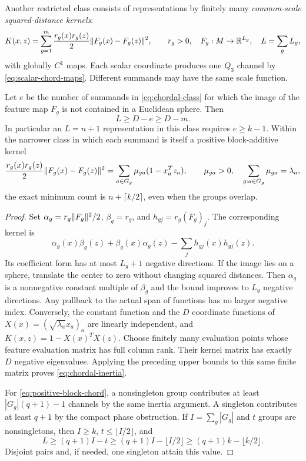 Another restricted class consists of representations by finitely many
\emph{common-scale squared-distance kernels}:
\begin{equation}\label{eq:chordal-class}
 K(x,z)=\sum_{g=1}^m\frac{r_g(x)r_g(z)}2
                  \lVert F_g(x)-F_g(z)\rVert^2,
 \qquad r_g>0,\quad F_g:M\to\mathbb R^{L_g},\quad L=\sum_g L_g,
\end{equation}
with globally $C^1$ maps. Each scalar coordinate produces one $Q_3$
channel by \eqref{eq:scalar-chord-maps}. Different summands may have the
same scale function.

\begin{proposition}\label{prop:chordal-inertia}
Let $e$ be the number of summands in \eqref{eq:chordal-class} for which
the image of the feature map $F_g$ is not contained in a Euclidean
sphere. Then
\begin{equation}\label{eq:chordal-inertia}
 L\geq D-e\geq D-m.
\end{equation}
In particular an $L=n+1$ representation in this class requires $e\geq k-1$.
Within the narrower class in which each summand is itself a positive
block-additive kernel
\begin{equation}\label{eq:positive-block-chord}
 \frac{r_g(x)r_g(z)}2\lVert F_g(x)-F_g(z)\rVert^2
   =\sum_{a\in G_g}\mu_{ga}(1-x_a^Tz_a),\qquad
 \mu_{ga}>0,\quad \sum_{g:a\in G_g}\mu_{ga}=\lambda_a,
\end{equation}
the exact minimum count is $n+\lceil k/2\rceil$, even when the groups
overlap.
\end{proposition}
\begin{proof}
Set $\alpha_g=r_g\lVert F_g\rVert^2/2$, $\beta_g=r_g$, and
$h_{gj}=r_g(F_g)_j$. The corresponding kernel is
\[
 \alpha_g(x)\beta_g(z)+\beta_g(x)\alpha_g(z)
                  -\sum_jh_{gj}(x)h_{gj}(z).
\]
Its coefficient form has at most $L_g+1$ negative directions. If the
image lies on a sphere, translate the center to zero without changing
squared distances. Then $\alpha_g$ is a nonnegative constant multiple
of $\beta_g$ and the bound improves to $L_g$ negative directions.
Any pullback to the actual span of functions has no larger negative
index. Conversely, the constant function and the $D$ coordinate
functions of $X(x)=(\sqrt{\lambda_a}x_a)_a$ are linearly independent,
and $K(x,z)=1-X(x)^TX(z)$. Choose finitely many evaluation points whose
feature evaluation matrix has full column rank. Their kernel matrix has
exactly $D$ negative eigenvalues. Applying the preceding upper bounds to
this same finite matrix proves \eqref{eq:chordal-inertia}.

For \eqref{eq:positive-block-chord}, a nonsingleton group contributes
at least $|G_g|(q+1)-1$ channels by the same inertia argument. A singleton
contributes at least $q+1$ by the compact phase obstruction. If
$I=\sum_g|G_g|$ and $t$ groups are nonsingletons, then $I\geq k$,
$t\leq\lfloor I/2\rfloor$, and
\[
 L\geq(q+1)I-t\geq(q+1)I-\lfloor I/2\rfloor
       \geq(q+1)k-\lfloor k/2\rfloor.
\]
Disjoint pairs and, if needed, one singleton attain this value.
\end{proof}

